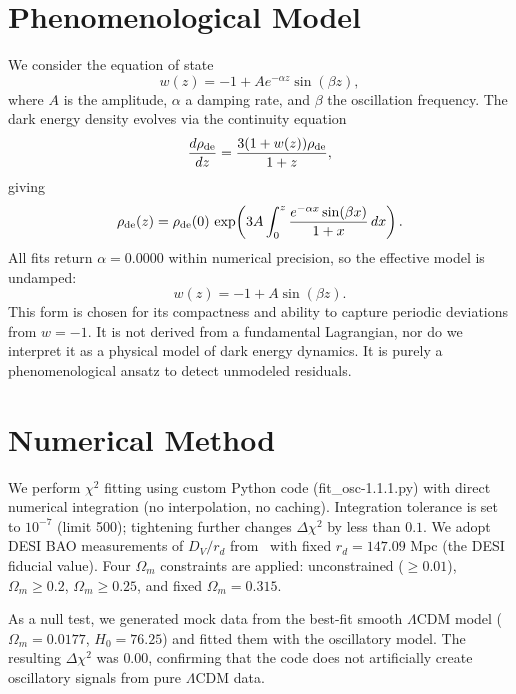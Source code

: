 \documentclass[10pt,a4paper,twocolumn]{article}
\begin{document}
\section{Phenomenological Model}
We consider the equation of state
\[
w(z) = -1 + A e^{-\alpha z}\sin(\beta z),
\]
where $A$ is the amplitude, $\alpha$ a damping rate, and $\beta$ the oscillation frequency. The dark energy density evolves via the continuity equation
\[
\frac{d\rho_{\rm de}}{dz} = \frac{3(1+w(z))\rho_{\rm de}}{1+z},
\]
giving
\[
\rho_{\rm de}(z) = \rho_{\rm de}(0)\,\exp\!\left(3A\int_0^z \frac{e^{-\alpha x}\sin(\beta x)}{1+x}\,dx\right).
\]
All fits return $\alpha=0.0000$ within numerical precision, so the effective model is undamped:
\[
w(z) = -1 + A\sin(\beta z).
\]
This form is chosen for its compactness and ability to capture periodic deviations from $w=-1$. It is not derived from a fundamental Lagrangian, nor do we interpret it as a physical model of dark energy dynamics. It is purely a phenomenological ansatz to detect unmodeled residuals.

\section{Numerical Method}
We perform $\chi^2$ fitting using custom Python code (fit\_osc-1.1.1.py) with direct numerical integration (no interpolation, no caching). Integration tolerance is set to $10^{-7}$ (limit 500); tightening further changes $\Delta\chi^2$ by less than $0.1$. We adopt DESI BAO measurements of $D_V/r_d$ from~\cite{DESI2024} with fixed $r_d=147.09$ Mpc (the DESI fiducial value). Four $\Omega_m$ constraints are applied: unconstrained ($\ge0.01$), $\Omega_m\ge0.2$, $\Omega_m\ge0.25$, and fixed $\Omega_m=0.315$.

As a null test, we generated mock data from the best-fit smooth $\Lambda$CDM model ($\Omega_m=0.0177$, $H_0=76.25$) and fitted them with the oscillatory model. The resulting $\Delta\chi^2$ was $0.00$, confirming that the code does not artificially create oscillatory signals from pure $\Lambda$CDM data.
\end{document}
